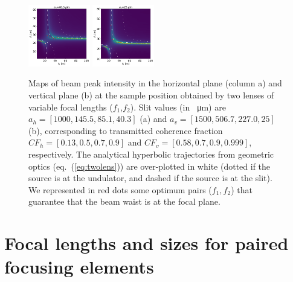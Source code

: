 \documentclass[doublecol]{epl2}
\newcommand{\inred}[1]{{\color{black}#1}} %
\begin{document}
\begin{figure}[htbp]
\includegraphics[width=0.24\textwidth]{H_0.png}
\includegraphics[width=0.24\textwidth]{V_0.png}
\caption{
        \label{fig:f1f2map}
    Maps of beam peak intensity in \inred{the} horizontal plane (column a) and vertical plane (b) at the sample position obtained by two lenses of variable focal lengths ($f_1$,$f_2$).
    Slit values (in \SI{}{\micro\meter}) are $a_h=[1000, 145.5, 85.1, 40.3]$ (a) and $a_v=[1500, 506.7, 227.0, 25]$ (b), corresponding to transmitted coherence fraction
    $CF_h=[0.13, 0.5, 0.7, 0.9]$ and
    $CF_v=[0.58, 0.7, 0.9, 0.999]$, respectively.
    The analytical \inred{hyperbolic} trajectories from geometric optics (\inred{e}q.~\inred{(}\ref{eq:twolens}\inred{)}) are over-plotted in white (dotted if \inred{the} source is at the undulator, and dashed if \inred{the} source is at the slit). We represented in red dots some optimum pairs ($f_1,f_2$) that guarantee that the beam waist is at the focal plane.
    }
\end{figure}






\section{Focal lengths and sizes for paired focusing elements}
\end{document}
